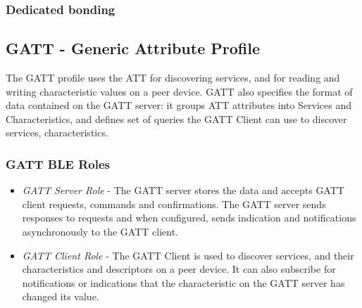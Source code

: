 \subsubsection{Dedicated bonding}


\subsection{GATT - Generic Attribute Profile}
The GATT profile uses the ATT for discovering services, and for reading and writing characteristic values on a peer device. GATT also specifies the format of data contained on the GATT server: it groups ATT attributes into Services and Characteristics, and defines set of queries the GATT Client can use to discover services, characteristics.

\subsubsection{GATT BLE Roles}

\begin{itemize}
\item \emph{GATT Server Role} - The GATT server stores the data and accepts GATT client requests, commands and confirmations. The GATT server sends responses to requests and when configured, sends indication and notifications asynchronously to the GATT client. 
\item \emph{GATT Client Role} - The GATT Client is used to discover services, and their characteristics and descriptors on a peer device. It can also subscribe for notifications or indications that the characteristic on the GATT server has changed its value. 
\end{itemize}

